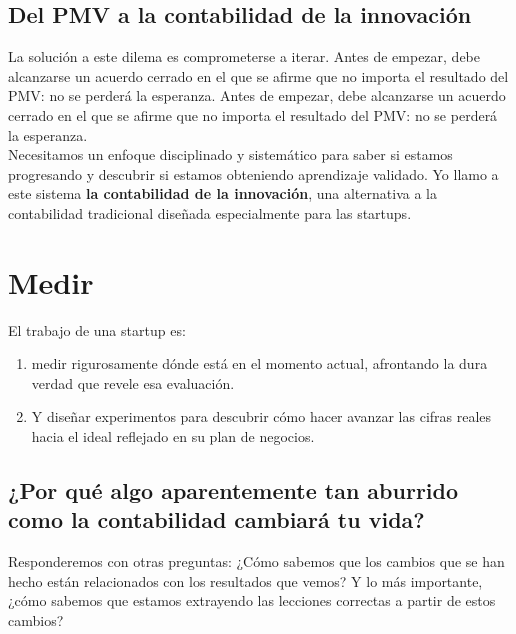 \documentclass[10pt]{article}
\begin{document}
\begin{multicols}{2}
\subsection*{Del PMV a la contabilidad de la innovación}
La solución a este dilema es comprometerse a iterar. {\color{blue} Antes de empezar, debe alcanzarse un acuerdo cerrado en el que se afirme que no importa el resultado del PMV: no se perderá la esperanza.} Antes de empezar, debe alcanzarse un acuerdo cerrado en el que se afirme que no importa el resultado del PMV: no se perderá la esperanza. \\
Necesitamos un enfoque disciplinado y sistemático para saber si estamos progresando y descubrir si estamos obteniendo aprendizaje validado. Yo llamo a este sistema\textbf{ la contabilidad de la innovación}, una alternativa a la contabilidad tradicional diseñada especialmente para las startups. 
\section*{Medir}
El trabajo de una startup es:
\begin{enumerate}
\item medir rigurosamente dónde está en el momento actual, afrontando la dura verdad que revele esa evaluación.
\item Y diseñar experimentos para descubrir cómo hacer avanzar las cifras reales hacia el ideal reflejado en su plan de negocios.
\end{enumerate}
\subsection*{¿Por qué algo aparentemente tan aburrido como la contabilidad cambiará tu vida?}
Responderemos con otras preguntas: ¿Cómo sabemos que los cambios que se han hecho están relacionados con los resultados que vemos? Y lo más importante, ¿cómo sabemos que estamos extrayendo las lecciones correctas a partir de estos cambios?

\end{multicols}
\end{document}
